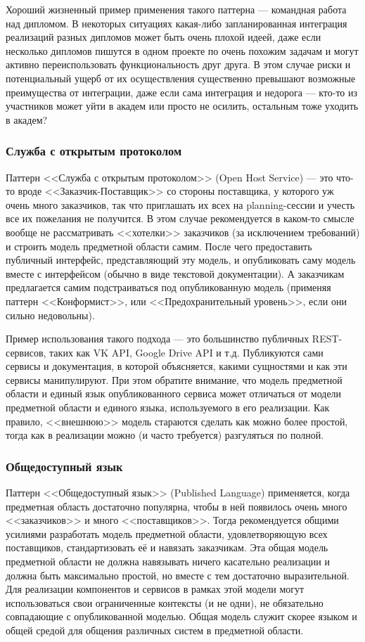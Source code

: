 \documentclass{../../text-style}
\begin{document}
Хороший жизненный пример применения такого паттерна --- командная работа над дипломом. В некоторых ситуациях какая-либо запланированная интеграция реализаций разных дипломов может быть очень плохой идеей, даже если несколько дипломов пишутся в одном проекте по очень похожим задачам и могут активно переиспользовать функциональность друг друга. В этом случае риски и потенциальный ущерб от их осуществления существенно превышают возможные преимущества от интеграции, даже если сама интеграция и недорога --- кто-то из участников может уйти в академ или просто не осилить, остальным тоже уходить в академ?

\subsubsection{Служба с открытым протоколом}

Паттерн <<Служба с открытым протоколом>> (Open Host Service) --- это что-то вроде <<Заказчик-Поставщик>> со стороны поставщика, у которого уж очень много заказчиков, так что приглашать их всех на planning-сессии и учесть все их пожелания не получится. В этом случае рекомендуется в каком-то смысле вообще не рассматривать <<хотелки>> заказчиков (за исключением требований) и строить модель предметной области самим. После чего предоставить публичный интерфейс, представляющий эту модель, и опубликовать саму модель вместе с интерфейсом (обычно в виде текстовой документации). А заказчикам предлагается самим подстраиваться под опубликованную модель (применяя паттерн <<Конформист>>, или <<Предохранительный уровень>>, если они сильно недовольны).

Пример использования такого подхода --- это большинство публичных REST-сервисов, таких как VK API, Google Drive API и т.д. Публикуются сами сервисы и документация, в которой объясняется, какими сущностями и как эти сервисы манипулируют. При этом обратите внимание, что модель предметной области и единый язык опубликованного сервиса может отличаться от модели предметной области и единого языка, используемого в его реализации. Как правило, <<внешнюю>> модель стараются сделать как можно более простой, тогда как в реализации можно (и часто требуется) разгуляться по полной.

\subsubsection{Общедоступный язык}

Паттерн <<Общедоступный язык>> (Published Language) применяется, когда предметная область достаточно популярна, чтобы в ней появилось очень много <<заказчиков>> и много <<поставщиков>>. Тогда рекомендуется общими усилиями разработать модель предметной области, удовлетворяющую всех поставщиков, стандартизовать её и навязать заказчикам. Эта общая модель предметной области не должна навязывать ничего касательно реализации и должна быть максимально простой, но вместе с тем достаточно выразительной. Для реализации компонентов и сервисов в рамках этой модели могут использоваться свои ограниченные контексты (и не одни), не обязательно совпадающие с опубликованной моделью. Общая модель служит скорее языком и общей средой для общения различных систем в предметной области. 
\end{document}
